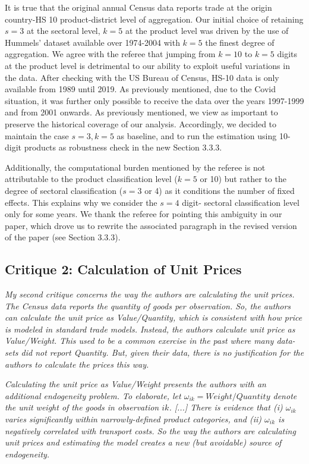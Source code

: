 \documentclass[a4paper,11pt]{article}
\begin{document}
It is true that the original annual Census data reports trade at the origin country-HS 10 product-district level of aggregation. Our initial choice of retaining $s=3$ at the sectoral level, $k=5$ at the product level was driven by the use of Hummels' dataset available over 1974-2004 with $k=5$ the finest degree of aggregation. We agree with the referee that jumping from $k=10$ to $k=5$ digits at the product level is detrimental to our ability to exploit useful variations in the data. After checking with the US Bureau of Census, HS-10 data is only available from 1989 until 2019. As previously mentioned, due to the Covid situation, it was further only possible to receive the data over the years 1997-1999 and from 2001 onwards. As previously mentioned, we view as important to preserve the historical coverage of our analysis. Accordingly, we decided to maintain the case $s=3, k=5$ as baseline, and to run the estimation using 10-digit products as robustness check in the new Section 3.3.3.

Additionally, the computational burden mentioned by the referee is not attributable to the product classification level ($k=5$ or 10) but rather to the degree of sectoral classification ($s=3$ or 4) as it conditions the number of fixed effects. This explains why we consider the $s=4$ digit- sectoral classification level only for some years. We thank the referee for pointing this ambiguity in our paper, which drove us to rewrite the associated paragraph in the revised version of the paper (see Section 3.3.3).


\subsection{Critique 2: Calculation of Unit Prices}

\textit{My second critique concerns the way the authors are calculating the unit prices.
The Census data reports the quantity of goods per observation. So, the authors
can calculate the unit price as Value/Quantity, which is consistent with how
price is modeled in standard trade models. Instead, the authors calculate unit
price as Value/Weight. This used to be a common exercise in the past where
many data-sets did not report Quantity. But, given their data, there is no
justification for the authors to calculate the prices this way.}

\textit{Calculating the unit price as Value/Weight presents the authors
with an additional endogeneity problem. To elaborate, let $\omega_{ik} = Weight/Quantity$
denote the unit weight of the goods in observation $ik$. [...] There is evidence that (i) $\omega_{ik}$ varies significantly within narrowly-defined product
categories, and (ii) $\omega_{ik}$ is negatively correlated with transport costs. So the
way the authors are calculating unit prices and estimating the model creates a
new (but avoidable) source of endogeneity.}
\end{document}
